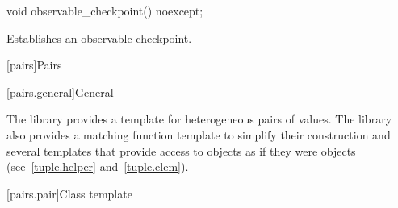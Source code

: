%
\begin{itemdecl}
void observable_checkpoint() noexcept;
\end{itemdecl}

\begin{itemdescr}
\pnum
\effects
Establishes an observable checkpoint.
\end{itemdescr}

[pairs]{Pairs}

[pairs.general]{General}

\pnum
The library provides a template for heterogeneous pairs of values.
The library also provides a matching function template to simplify
their construction and several templates that provide access to 
objects as if they were  objects (see~\ref{tuple.helper}
and~\ref{tuple.elem}).%
%
%
%

[pairs.pair]{Class template }

